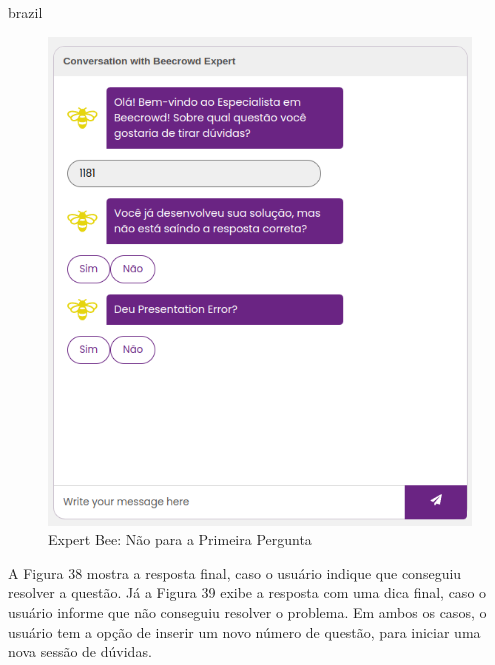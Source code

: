 \begin{otherlanguage*}{brazil}
\begin{figure}[H]
    \centering
            \caption{Expert Bee: Não para a Primeira Pergunta}
            \label{fig:ModeloConceitual}
        \includegraphics[scale=0.63]{pictures/desenvolvimento/expert_bee_primeira_pergunta_nao.png}
\end{figure}

A Figura 38 mostra a resposta final, caso o usuário indique que conseguiu resolver a questão. Já a Figura 39 exibe a resposta com uma dica final, caso o usuário informe que não conseguiu resolver o problema. Em ambos os casos, o usuário tem a opção de inserir um novo número de questão, para iniciar uma nova sessão de dúvidas.


\end{otherlanguage*}
